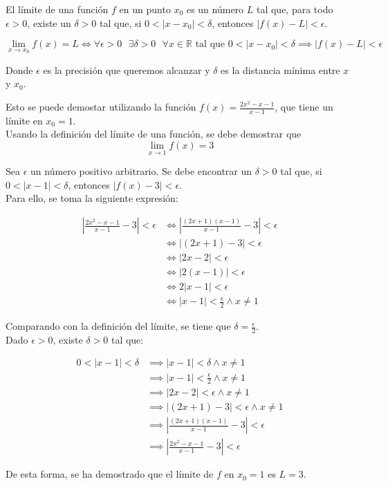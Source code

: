 \dfn{} {
    El límite de una función $f$ en un punto $x_0$ es un número 
    $L$ tal que, para todo $\epsilon > 0$, existe un $\delta > 0$ tal que, si 
    $0 < |x - x_0| < \delta$, entonces $|f(x) - L| < \epsilon$.

    \[
        \lim_{x \to x_0} f(x) = L \iff \forall \epsilon > 0 \text{ } \exists \delta > 0 \text{ } \forall x \in \mathbb{R} \text{ tal que } 0 < |x - x_0| < \delta \implies |f(x) - L| < \epsilon 
    \]

    Donde $\epsilon$ es la precisión que queremos alcanzar y 
    $\delta$ es la distancia mínima entre $x$ y $x_0$. 
}

\ex{} {
    Esto se puede demostar utilizando la función $f(x) = \frac{2x^2-x-1}{x-1}$,
    que tiene un límite en $x_0 = 1$. \\

    Usando la definición del límite de una función, se debe demostrar que 
    \[
      \lim_{x \to 1} f(x) = 3  
    \]

    Sea $\epsilon$ un número positivo arbitrario. Se debe encontrar un 
    $\delta > 0$ tal que, si $0 < |x - 1| < \delta$, entonces
    $|f(x) - 3| < \epsilon$. \\

    Para ello, se toma la siguiente expresión:

    \[
        \begin{align*}
            \left|\frac{2x^2-x-1}{x-1} - 3\right| < \epsilon &\iff \left|\frac{(2x+1)(x-1)}{x-1} - 3\right| < \epsilon \\
            &\iff |(2x+1) - 3| < \epsilon \\
            &\iff |2x - 2| < \epsilon \\
            &\iff |2(x-1)| < \epsilon \\
            &\iff 2|x-1| < \epsilon \\
            &\iff |x-1| < \frac{\epsilon}{2} \wedge x \neq 1
        \end{align*}
    \]

    Comparando con la definición del límite, se tiene que $\delta = \frac{\epsilon}{2}$. \\

    Dado $\epsilon > 0$, existe $\delta > 0$ tal que:

    \[
        \begin{align*}
            0 < |x - 1| < \delta &\implies |x-1| < \delta \wedge x \neq 1 \\
            &\implies |x-1| < \frac{\epsilon}{2} \wedge x \neq 1 \\
            &\implies |2x - 2| < \epsilon \wedge x \neq 1 \\
            &\implies |(2x+1) - 3| < \epsilon \wedge x \neq 1 \\
            &\implies \left|\frac{(2x+1)(x-1)}{x-1} - 3\right| < \epsilon \\
            &\implies \left|\frac{2x^2-x-1}{x-1} - 3\right| < \epsilon
        \end{align*}
    \]

    De esta forma, se ha demostrado que el límite de $f$ en $x_0 = 1$ es $L = 3$.
}

